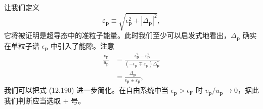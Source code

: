 让我们定义
\begin{equation*}
\varepsilon_{\mathbf p}\equiv\sqrt{\epsilon^2_{\mathbf p}+\left|\Delta_{\mathbf p}\right|^2}, \tag{12.191}
\end{equation*}
它将被证明是超导态中的准粒子能量。此时我们至少可以启发式地看出，$\Delta_{\mathbf p}$ 确实在单粒子谱 $\epsilon_{\mathbf p}$ 中引入了能隙。注意
\begin{align*}
\frac{v_{\mathbf p}}{u_{\mathbf p}}&=\frac{\epsilon^2_{\mathbf p}-\varepsilon^2_{\mathbf p}}{\left(-\epsilon_{\mathbf p}\mp\varepsilon_{\mathbf p}\right)\Delta^*_{\mathbf p}}\\
&=\frac{\Delta_{\mathbf p}}{\epsilon_{\mathbf p}\pm\varepsilon_{\mathbf p}}, \tag{12.192}
\end{align*}
我们可以把式 (12.190) 进一步简化。在自由系统中当 $\epsilon_{\mathbf p}>\epsilon_{\mathrm F}$ 时 $v_{\mathbf p}/u_{\mathbf p}\to 0$，据此我们判断应当选取 $+$ 号。


